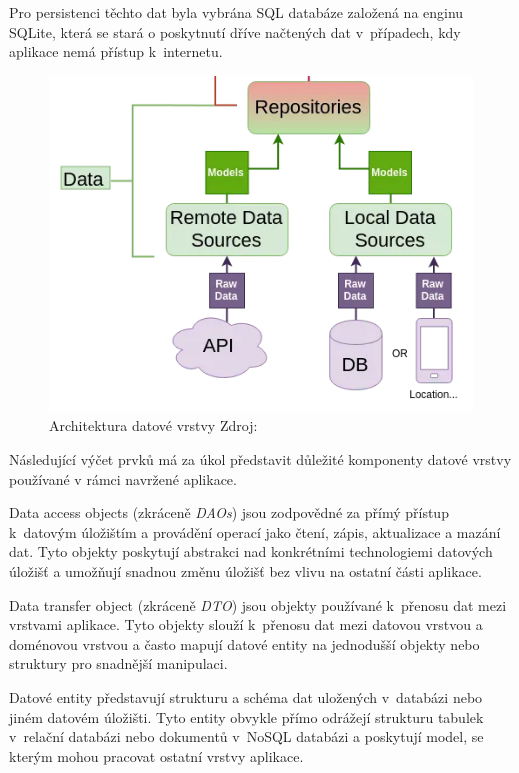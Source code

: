 Pro persistenci těchto dat byla vybrána SQL databáze založená na enginu SQLite, která se stará o poskytnutí dříve načtených dat 
v~případech, kdy aplikace nemá přístup k~internetu.


\begin{figure}[H]
  \centering
  \includegraphics[width=.5\textwidth]{data_layer_diagram.png}
  \caption{Architektura datové vrstvy Zdroj: \cite{imgDataFlow}}
  \label{fig:arch_data_layer}
\end{figure}


Následující výčet prvků má za úkol představit důležité komponenty datové vrstvy používané v rámci navržené aplikace.

Data access objects (zkráceně \textit{DAOs}) jsou zodpovědné za přímý přístup k~datovým úložištím a provádění operací jako čtení, zápis, aktualizace a mazání dat. \cite{oracleDAO} Tyto objekty 
poskytují abstrakci nad konkrétními technologiemi datových úložišť a umožňují snadnou změnu úložišť bez vlivu na ostatní části aplikace.

Data transfer object (zkráceně \textit{DTO}) jsou objekty používané k~přenosu dat mezi vrstvami aplikace. Tyto objekty slouží k~přenosu dat mezi datovou vrstvou a doménovou 
vrstvou a často mapují datové entity na jednodušší objekty nebo struktury pro snadnější manipulaci. \cite{DTO}

Datové entity představují strukturu a schéma dat uložených v~databázi nebo jiném datovém úložišti. Tyto entity obvykle přímo odrážejí
strukturu tabulek v~relační databázi nebo dokumentů v~NoSQL databázi a poskytují model, se kterým mohou pracovat ostatní vrstvy aplikace.


